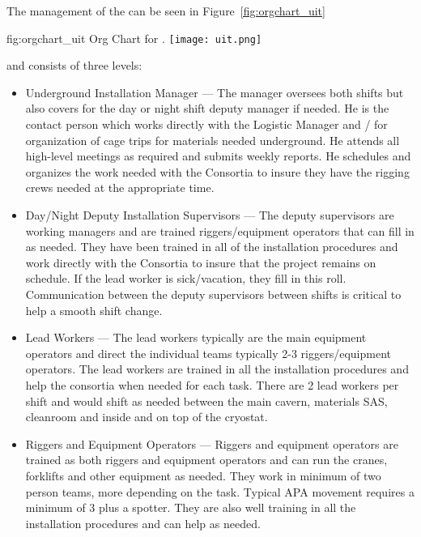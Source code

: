 The management of the  can be seen in Figure~\ref{fig:orgchart_uit}
\begin{dunefigure}{fig:orgchart_uit}
  {Org Chart for  .}
  \texttt{[image: uit.png]}
\end{dunefigure}
and consists of three levels:
\begin{itemize}
  \item Underground Installation Manager --- The  manager oversees
    both shifts but also covers for the day or night shift deputy
    manager if needed.  He is the contact person which works directly
    with the Logistic Manager and \surf/ for organization of cage
    trips for materials needed underground.  He attends all high-level
    meetings as required and submits weekly reports.  He schedules and
    organizes the work needed with the Consortia to insure they have
    the rigging crews needed at the appropriate time.
  \item Day/Night Deputy Installation Supervisors --- The deputy
      supervisors are working managers and are trained
      riggers/equipment operators that can fill in as needed.  They
      have been trained in all of the installation procedures and work
      directly with the Consortia to insure that the project remains
      on schedule.  If the lead worker is sick/vacation, they fill in
      this roll. Communication between the deputy supervisors between
      shifts is critical to help a smooth shift change.
  \item Lead Workers --- The lead workers typically are the main
    equipment operators and direct the individual teams typically 2-3
    riggers/equipment operators.  The lead workers are trained in all
    the installation procedures and help the consortia when needed for
    each task.  There are 2 lead workers per shift and would shift as
    needed between the main cavern, materials SAS, cleanroom and
    inside and on top of the cryostat.
  \item Riggers and Equipment Operators --- Riggers and equipment
    operators are trained as both riggers and equipment operators and
    can run the cranes, forklifts and other equipment as needed.  They
    work in minimum of two person teams, more depending on the
    task. Typical APA movement requires a minimum of 3 plus a
    spotter. They are also well training in all the installation
    procedures and can help as needed.
\end{itemize}

